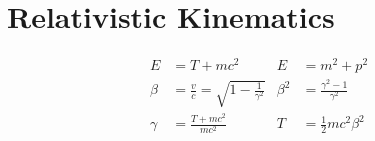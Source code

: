 \section{Relativistic Kinematics}
\begin{align*}
E &= T + m c^2 & E &= m^2 + p^2 \\
\beta &= \frac{v}{c} = \sqrt{1 - \frac{1}{\gamma^2}} & \beta^2 &= \frac{\gamma^2 - 1}{\gamma^2} \\
\gamma &= \frac{T + m c^2}{m c^2} & T &= \frac{1}{2} m c^2 \beta^2
\end{align*}